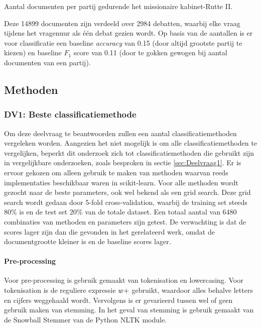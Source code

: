 \begin{table}[H]
\label{aantallen}
\caption{Aantal documenten per partij gedurende het missionaire kabinet-Rutte II.}
\centering

\end{table}
Deze 14899 documenten zijn verdeeld over 2984 debatten, waarbij elke vraag tijdens het vragenuur als één debat gezien wordt. Op basis van de aantallen is er voor classificatie een baseline \textit{accuracy} van 0.15 (door altijd grootste partij te kiezen) en baseline $F_1$ score van 0.11 (door te gokken gewogen bij aantal documenten van een partij).\par


\subsection{Methoden}


\subsubsection{DV1: Beste classificatiemethode}
Om deze deelvraag te beantwoorden zullen een aantal classificatiemethoden vergeleken worden. Aangezien het niet mogelijk is om alle classificatiemethoden te vergelijken, beperkt dit onderzoek zich tot classificatiemethoden die gebruikt zijn in vergelijkbare onderzoeken, zoals besproken in sectie \ref{sec:Deelvraag1}. Er is ervoor gekozen om alleen gebruik te maken van methoden waarvan reeds implementaties beschikbaar waren in scikit-learn. Voor alle methoden wordt gezocht naar de beste parameters, ook wel bekend als een grid search. Deze grid search wordt gedaan door 5-fold cross-validation, waarbij de training set steeds 80\% is en de test set 20\% van de totale dataset. Een totaal aantal van 6480 combinaties van methoden en parameters zijn getest. De verwachting is dat de scores lager zijn dan die gevonden in het gerelateerd werk, omdat de documentgrootte kleiner is en de baseline scores lager.

\paragraph{Pre-processing}
Voor pre-processing is gebruik gemaakt van tokenisation en lowercasing. Voor tokenisation is de reguliere expressie $\\w+$ gebruikt, waardoor alles behalve letters en cijfers weggehaald wordt. Vervolgens is er gevarieerd tussen wel of geen gebruik maken van stemming. In het geval van stemming is gebruik gemaakt van de Snowball Stemmer van de Python NLTK module.

